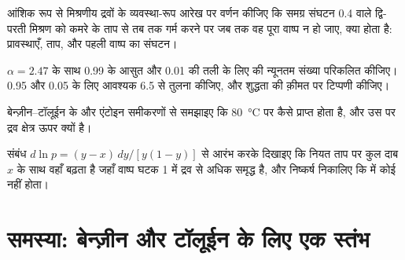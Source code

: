 \begin{exercise}[$\star\star$]\label{exo:b2:liquid-vapour-diagrams:9}
आंशिक रूप से मिश्रणीय द्रवों के व्यवस्था-रूप आरेख पर वर्णन कीजिए कि
समग्र संघटन 0.4 वाले द्वि-परती मिश्रण को कमरे के ताप से तब तक गर्म करने पर
जब तक वह पूरा वाष्प न हो जाए, क्या होता है: प्रावस्थाएँ, ताप, और पहली
वाष्प का संघटन।
\end{exercise}

\begin{exercise}[$\star\star\star$]\label{exo:b2:liquid-vapour-diagrams:10}
$\alpha = 2.47$ के साथ 0.99 के आसुत और 0.01 की तली के लिए  की
न्यूनतम संख्या परिकलित कीजिए। 0.95 और 0.05 के लिए आवश्यक 6.5 से तुलना
कीजिए, और शुद्धता की क़ीमत पर टिप्पणी कीजिए।
\end{exercise}

\begin{exercise}[$\star\star\star$]\label{exo:b2:liquid-vapour-diagrams:11}
बेन्ज़ीन--टॉलूईन के  और एंटोइन समीकरणों से समझाइए कि
\qty{80}{\degreeCelsius} पर  कैसे प्राप्त होता है,
और उस पर द्रव क्षेत्र ऊपर क्यों है।
\end{exercise}

\begin{exercise}[$\star\star\star$]\label{exo:b2:liquid-vapour-diagrams:12}
संबंध $d\ln p = (y - x)\,dy/[y(1 - y)]$ से आरंभ करके दिखाइए कि नियत
ताप पर कुल दाब $x$ के साथ वहाँ बढ़ता है जहाँ वाष्प
घटक 1 में द्रव से अधिक समृद्ध है, और निष्कर्ष निकालिए कि  में कोई
 नहीं होता।
\end{exercise}

\section{समस्या: बेन्ज़ीन और टॉलूईन के लिए एक स्तंभ}

